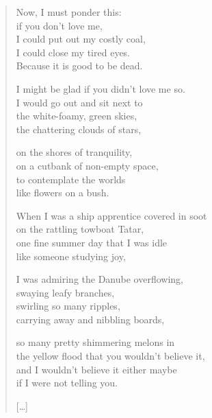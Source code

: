 \documentclass[11pt]{book}
\newcommand*{\centeredornament}{\centerline{\pgfornament[width=6cm]{88}}}
\begin{document}
\newpage

\vspace*{-15mm}
\centeredornament



\begin{verse}
  Now, I must ponder this: \\
  if you don't love me, \\
  I could put out my costly coal, \\
  I could close my tired eyes. \\
  Because it is good to be dead.

  I might be glad if you didn't love me so. \\
  I would go out and sit next to \\
  the white-foamy, green skies, \\
  the chattering clouds of stars,

  on the shores of tranquility, \\
  on a cutbank of non-empty space, \\
  to contemplate the worlds \\
  like flowers on a bush.

  When I was a ship apprentice covered in soot\hspace*{-1mm} \\
  on the rattling towboat Tatar,\hspace*{-1mm} \\
  one fine summer day that I was idle \\
  like someone studying joy,

  I was admiring the Danube overflowing, \\
  swaying leafy branches, \\
  swirling so many ripples, \\
  carrying away and nibbling boards,

  so many pretty shimmering melons in \\
  the yellow flood that you wouldn't believe it, \\
  and I wouldn't believe it either maybe \\
  if I were not telling you.

  \hfill [\ldots]
\end{verse}

\newpage

\vspace*{-15mm}
\centeredornament
\end{document}
